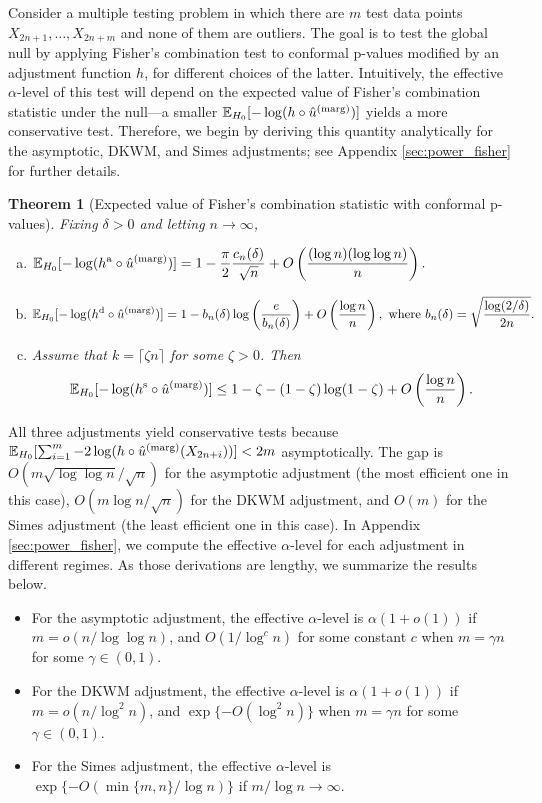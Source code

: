 \documentclass[11pt]{article}
\newtheorem{thm}{Theorem}
\def\E{\mathbb{E}}
\def\marg{\textnormal{(marg)}}
\def\dkwm{\textnormal{d}}
\def\simes{\textnormal{s}}
\def\asym{\textnormal{a}}
\newcommand{\lb}{\left(}
\newcommand{\rb}{\right)}
\begin{document}
Consider a multiple testing problem in which there are $m$ test data points $X_{2n+1}, \ldots, X_{2n+m}$ and none of them are outliers. The goal is to test the global null by applying Fisher's combination test to conformal p-values modified by an adjustment function $h$, for different choices of the latter. Intuitively, the effective $\alpha$-level of this test will depend on the expected value of Fisher's combination statistic under the null---a smaller $\E_{H_0}[-\log (h\circ \hat{u}^\marg)]$ yields a more conservative test. Therefore, we begin by deriving this quantity analytically for the asymptotic, DKWM, and Simes adjustments; see Appendix \ref{sec:power_fisher} for further details. 
\begin{thm}[Expected value of Fisher's combination statistic with conformal p-values] \label{theorem:fisher-mean}
Fixing $\delta > 0$ and letting $n\rightarrow \infty$, 
\begin{enumerate}[(a)]
\item $\displaystyle\E_{H_0}[-\log (h^\asym\circ \hat{u}^\marg)] = 1 - \frac{\pi}{2}\frac{c_n(\delta)}{\sqrt{n}} + O\lb \frac{(\log n)(\log \log n)}{n}\rb.$
\item $\displaystyle\E_{H_0}[-\log (h^\dkwm\circ \hat{u}^\marg)] = 1 - b_n(\delta)\log\lb\frac{e}{b_n(\delta)}\rb + O\lb\frac{\log n}{n}\rb, \,\, \text{where} \,\,b_{n}(\delta) = \sqrt{\frac{\log(2 / \delta)}{2n}}.$
\item   Assume that $k = \lceil\zeta n\rceil$ for some $\zeta > 0$. Then
  \[\E_{H_0}[-\log (h^\simes \circ \hat{u}^\marg)] \le 1 - \zeta - (1 - \zeta)\log (1 - \zeta) + O\lb\frac{\log n}{n}\rb.\]
\end{enumerate}
\end{thm}
All three adjustments yield conservative tests because $\E_{H_0}[\sum_{i=1}^{m}-2\log(h\circ \hat{u}^\marg(X_{2n+i}))] < 2m$ asymptotically. The gap is $O(m\sqrt{\log \log n} / \sqrt{n})$ for the asymptotic adjustment (the most efficient one in this case), $O(m\log n / \sqrt{n})$ for the DKWM adjustment, and $O(m)$ for the Simes adjustment (the least efficient one in this case). In Appendix \ref{sec:power_fisher}, we compute the effective $\alpha$-level for each adjustment in different regimes. As those derivations are lengthy, we summarize the results below. 
\begin{itemize}
\item For the asymptotic adjustment, the effective $\alpha$-level is $\alpha(1 + o(1))$ if $m = o(n / \log \log n)$, and $O(1 / \log^c n)$ for some constant $c$ when $m = \gamma n$ for some $\gamma \in (0, 1)$.
\item For the DKWM adjustment, the effective $\alpha$-level is $\alpha(1 + o(1))$ if $m = o(n / \log^2 n)$, and $\exp\{-O(\log^2 n)\}$ when $m = \gamma n$ for some $\gamma \in (0, 1)$.
\item For the Simes adjustment, the effective $\alpha$-level is $\exp\{-O(\min\{m, n\} / \log n)\}$ if $m / \log n\rightarrow \infty$.
\end{itemize}
\end{document}
